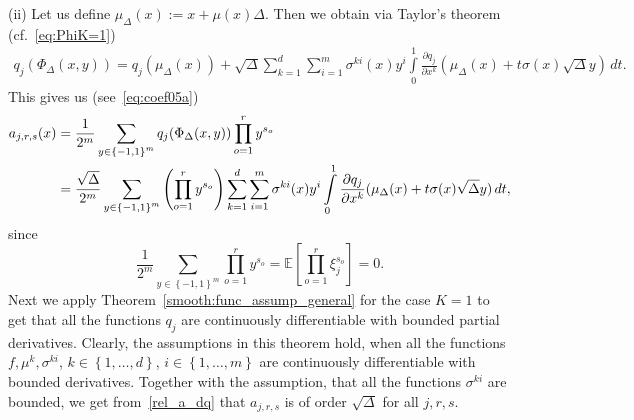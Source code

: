 \documentclass[11pt,a4paper]{amsart}
\theoremstyle{plain}
\theoremstyle{definition}
\theoremstyle{remark}
\numberwithin{equation}{section}
\newcommand*{\EE}{\mathbb E}
\begin{document}
(ii) Let us define $\mu_\Delta(x):=x+\mu(x)\Delta$. Then we obtain via Taylor's theorem (cf.~\eqref{eq:PhiK=1})
\begin{align*}
q_j(\Phi_\Delta(x,y))=q_j(\mu_\Delta(x))+\sqrt{\Delta}\sum_{k=1}^d\sum_{i=1}^m  \sigma^{ki}(x)y^i\int\limits_0^1\frac{\partial q_j}{\partial x^k}(\mu_\Delta(x)+t\sigma(x)\sqrt{\Delta}y)\,dt.
\end{align*}
This gives us (see~\eqref{eq:coef05a})
\begin{align}
\notag
a_{j,r,s}(x)&=\frac{1}{2^m}\sum_{y\in\left\{-1,1\right\}^m}
q_j(\Phi_\Delta(x,y))\prod_{o=1}^r y^{s_o}\\
\label{rel_a_dq}
&=\frac{\sqrt{\Delta}}{2^m}\sum_{y\in\left\{-1,1\right\}^m}\left(\prod_{o=1}^ry^{s_o}\right)\sum_{k=1}^d\sum_{i=1}^m  \sigma^{ki}(x)y^i\int\limits_0^1\frac{\partial q_j}{\partial x^k}(\mu_\Delta(x)+t\sigma(x)\sqrt{\Delta}y)\,dt,
\end{align}
since
$$
\frac{1}{2^m}\sum_{y\in\left\{-1,1\right\}^m}\prod_{o=1}^ry^{s_o}=\EE\left[\prod_{o=1}^r\xi_j^{s_o}\right]=0.
$$
Next we apply Theorem~\ref{smooth:func_assump_general} for the case $K=1$ to get that all the functions $q_j$ are continuously differentiable with bounded partial derivatives. Clearly, the assumptions in this theorem hold, when all the functions $f,\mu^k,\sigma^{ki}$, $k\in\left\{1,\ldots,d\right\}$, $i\in\left\{1,\ldots,m\right\}$ are continuously differentiable with bounded derivatives. Together with the assumption, that all the functions $\sigma^{ki}$ are bounded, we get from~\eqref{rel_a_dq} that $a_{j,r,s}$ is of order $\sqrt{\Delta}$ for all $j,r,s$.
\end{document}
